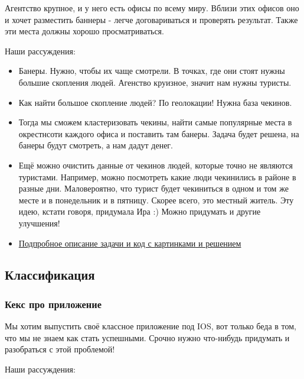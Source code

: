 \documentclass[12pt, a4paper, oneside]{article}
\begin{document}
Агентство крупное, и у него есть офисы по всему миру. Вблизи этих офисов оно и хочет разместить баннеры - легче договариваться и проверять результат. Также эти места должны хорошо просматриваться. 

Наши рассуждения: 

\begin{itemize}
	\item Банеры. Нужно, чтобы их чаще смотрели. В точках, где они стоят нужны большие скопления людей. Агенство круизное, значит нам нужны туристы. 
	
	\item Как найти большое скопление людей? По геолокации! Нужна база чекинов. 
	
	\item  Тогда мы сможем кластеризовать чекины, найти самые популярные места в окрестнсоти каждого офиса и поставить там банеры. Задача будет решена, на банеры будут смотреть, а нам дадут денег. 
	
	\item Ещё можно очистить данные от чекинов людей, которые точно не являются туристами. Например, можно посмотреть какие люди чекинились в районе в разные дни. Маловероятно, что турист будет чекиниться в одном и том же месте и в понедельник и в пятницу. Скорее всего, это местный житель. Эту идею, кстати говоря, придумала Ира :)  Можно придумать и другие улучшения! 

	\item \href{http://nbviewer.jupyter.org/github/FUlyankin/HSE_Data_Culture/blob/master/ML%20for%20marketing%202018%20autumn/sem_23/1.2%20Banners.ipynb}{Подпробное описание задачи и код с картинками и решением} 
\end{itemize}


\subsection*{Классификация} 

\subsubsection*{Кекс про приложение}

Мы хотим выпустить своё классное приложение под IOS, вот только беда в том, что мы не знаем как стать успешными. Срочно нужно что-нибудь придумать и разобраться с этой проблемой! 

Наши рассуждения: 
\end{document}
